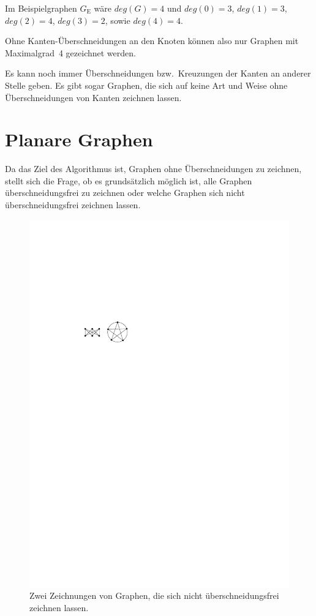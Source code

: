 \documentclass[a4paper]{scrreprt}
\theoremstyle{definition}
\begin{document}
Im Beispielgraphen $G_\text{E}$ wäre $deg(G) = 4$ und $deg(0) = 3$, $deg(1) = 3$, $deg(2) = 4$, $deg(3) = 2$, sowie $deg(4) = 4$.

Ohne Kanten-Überschneidungen an den Knoten können also nur Graphen mit Maximalgrad~4 gezeichnet werden. 

Es kann noch immer Überschneidungen bzw.\ Kreuzungen der Kanten an anderer Stelle geben. Es gibt sogar Graphen, die sich auf keine Art und Weise ohne Überschneidungen von Kanten zeichnen lassen.


\section{Planare Graphen}

Da das Ziel des Algorithmus ist, Graphen ohne Überschneidungen zu zeichnen, stellt sich die Frage, ob es grundsätzlich möglich ist, alle Graphen überschneidungsfrei zu zeichnen oder welche Graphen sich nicht überschneidungsfrei zeichnen lassen.

\begin{figure}[h]
  \centering
  \includegraphics{nonplanar}
  \caption{Zwei Zeichnungen von Graphen, die sich nicht überschneidungsfrei zeichnen lassen.}
  \label{fig:nonplanar}
\end{figure}
\end{document}
